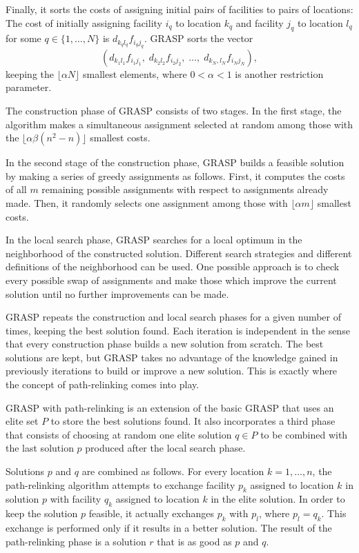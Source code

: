 \documentclass{bioinfo}
\begin{document}
Finally, it sorts the costs of assigning initial pairs of facilities to pairs
of locations: The cost of initially assigning facility $i_q$ to location $k_q$
and facility $j_q$ to location $l_q$
for some $q\in\{1,\ldots,N\}$ is $d_{k_q l_q} f_{i_q j_q}$. GRASP sorts
the vector
\begin{displaymath}
(d_{k_1 l_1}  f_{i_1 j_1},\;
d_{k_2 l_2}  f_{i_2 j_2},\; \ldots,\;
d_{k_N, l_N}  f_{i_N j_N}),
\end{displaymath}
keeping the $\lfloor \alpha N \rfloor$ smallest elements, where $0 < \alpha <
1$ is another restriction parameter.

The construction phase of GRASP consists of two stages. In the first stage,
the algorithm makes a simultaneous assignment selected at random among those
with the $\lfloor \alpha \beta (n^2 - n) \rfloor$ smallest costs.

In the second stage of the construction phase, GRASP builds a feasible
solution by making a series of greedy assignments as follows. First, it
computes the costs of all $m$ remaining possible assignments with respect to
assignments already made. Then, it randomly selects one assignment among those
with $\lfloor \alpha m \rfloor$ smallest costs.

In the local search phase, GRASP searches for a local optimum in the neighborhood of the constructed solution. Different search strategies and different definitions of the neighborhood can be used. One possible approach is to check every possible swap of assignments and make those which improve the current solution until no further improvements can be made.

GRASP repeats the construction and local search phases for a given number of times, keeping the best solution found. Each iteration is independent in the sense that every construction phase builds a new solution from scratch. The best solutions are kept, but GRASP takes no advantage of the knowledge gained in previously iterations to build or improve a new solution. This is exactly where the concept of path-relinking comes into play.

GRASP with path-relinking is an extension of the basic GRASP that uses an elite set $P$ to store the best solutions found. It also incorporates a third phase that consists of choosing at random one elite solution $q \in P$  to be combined with the last solution $p$ produced after the local search phase.

Solutions $p$ and $q$ are combined as follows. For every location $k = 1, \ldots, n$, the path-relinking algorithm attempts to exchange facility $p_k$ assigned to location $k$ in  solution $p$ with facility $q_k$ assigned to location $k$ in the elite solution. In order to keep the solution $p$ feasible, it actually exchanges $p_k$ with $p_l$, where $p_l = q_k$. This exchange is performed only if it results in a better solution. The result of the path-relinking phase is a solution $r$ that is as good as $p$ and $q$.
\end{document}
